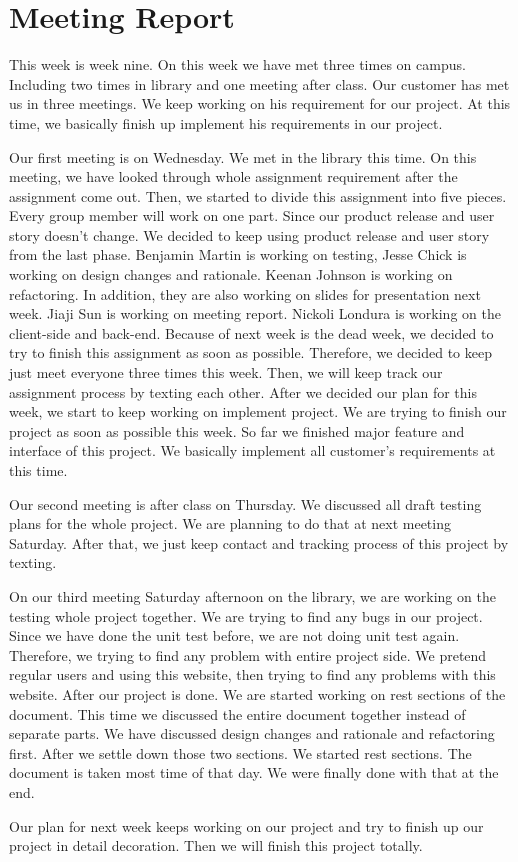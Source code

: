 \documentclass[12pt]{article}
\begin{document}
\section{Meeting Report}

\par This week is week nine. On this week we have met three times on campus. Including two times in library and one meeting after class. Our customer has met us in three meetings. We keep working on his requirement for our project. At this time, we basically finish up implement his requirements in our project.\\

\par Our first meeting is on Wednesday. We met in the library this time. On this meeting, we have looked through whole assignment requirement after the assignment come out. Then, we started to divide this assignment into five pieces. Every group member will work on one part. Since our product release and user story doesn’t change. We decided to keep using product release and user story from the last phase. Benjamin Martin is working on testing, Jesse Chick is working on design changes and rationale. Keenan Johnson is working on refactoring. In addition, they are also working on slides for presentation next week. Jiaji Sun is working on meeting report. Nickoli Londura is working on the client-side and back-end. Because of next week is the dead week, we decided to try to finish this assignment as soon as possible. Therefore, we decided to keep just meet everyone three times this week. Then, we will keep track our assignment process by texting each other. After we decided our plan for this week, we start to keep working on implement project. We are trying to finish our project as soon as possible this week. So far we finished major feature and interface of this project. We basically implement all customer’s requirements at this time.\\

\par Our second meeting is after class on Thursday. We discussed all draft testing plans for the whole project. We are planning to do that at next meeting Saturday. After that, we just keep contact and tracking process of this project by texting.\\

\par On our third meeting Saturday afternoon on the library, we are working on the testing whole project together. We are trying to find any bugs in our project. Since we have done the unit test before, we are not doing unit test again. Therefore, we trying to find any problem with entire project side. We pretend regular users and using this website, then trying to find any problems with this website. After our project is done. We are started working on rest sections of the document. This time we discussed the entire document together instead of separate parts. We have discussed design changes and rationale and refactoring first. After we settle down those two sections. We started rest sections. The document is taken most time of that day. We were finally done with that at the end.\\

\par Our plan for next week keeps working on our project and try to finish up our project in detail decoration. Then we will finish this project totally.\\
\end{document}
